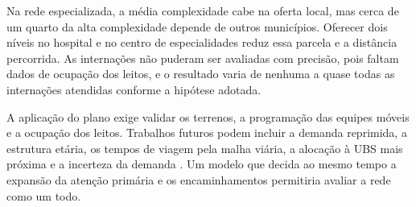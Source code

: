 \documentclass[12pt,a4paper,oneside]{report}
\begin{document}
Na rede especializada, a média complexidade cabe na oferta local, mas cerca de um quarto da alta
complexidade depende de outros municípios. Oferecer dois níveis no hospital e no centro de
especialidades reduz essa parcela e a distância percorrida. As internações não puderam ser avaliadas com
precisão, pois faltam dados de ocupação dos leitos, e o resultado varia de nenhuma a quase todas as
internações atendidas conforme a hipótese adotada.

A aplicação do plano exige validar os terrenos, a programação das equipes móveis e a ocupação dos
leitos. Trabalhos futuros podem incluir a demanda reprimida, a estrutura etária, os tempos de viagem pela
malha viária, a alocação à UBS mais próxima e a incerteza da demanda \citep{snyder2006}. Um modelo que
decida ao mesmo tempo a expansão da atenção primária e os encaminhamentos permitiria avaliar a rede como
um todo.
\end{document}

